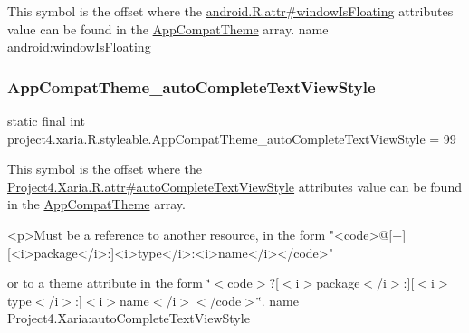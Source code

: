 This symbol is the offset where the \hyperlink{}{android.\+R.\+attr\#window\+Is\+Floating} attribute\textquotesingle{}s value can be found in the \hyperlink{classproject4_1_1xaria_1_1R_1_1styleable_aad8bec413e2350f9404e6ff0e831a85d}{App\+Compat\+Theme} array.  name android\+:window\+Is\+Floating \mbox{\label{classproject4_1_1xaria_1_1R_1_1styleable_a7608aea43314e12bc4f420fc021aac72}} 
\subsubsection{\texorpdfstring{App\+Compat\+Theme\+\_\+auto\+Complete\+Text\+View\+Style}{AppCompatTheme\_autoCompleteTextViewStyle}}
{\footnotesize\ttfamily static final int project4.\+xaria.\+R.\+styleable.\+App\+Compat\+Theme\+\_\+auto\+Complete\+Text\+View\+Style = 99\hspace{0.3cm}{\ttfamily [static]}}

This symbol is the offset where the \hyperlink{}{Project4.\+Xaria.\+R.\+attr\#auto\+Complete\+Text\+View\+Style} attribute\textquotesingle{}s value can be found in the \hyperlink{classproject4_1_1xaria_1_1R_1_1styleable_aad8bec413e2350f9404e6ff0e831a85d}{App\+Compat\+Theme} array.

\begin{DoxyVerb}      <p>Must be a reference to another resource, in the form "<code>@[+][<i>package</i>:]<i>type</i>:<i>name</i></code>"
\end{DoxyVerb}
 or to a theme attribute in the form \char`\"{}$<$code$>$?\mbox{[}$<$i$>$package$<$/i$>$\+:\mbox{]}\mbox{[}$<$i$>$type$<$/i$>$\+:\mbox{]}$<$i$>$name$<$/i$>$$<$/code$>$\char`\"{}.  name Project4.\+Xaria\+:auto\+Complete\+Text\+View\+Style \mbox{\label{classproject4_1_1xaria_1_1R_1_1styleable_ae837237fac21a2cede4731aba76d2506}} 
